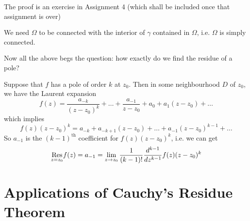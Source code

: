 \documentclass[11pt, oneside]{book}
\begin{document}
The proof is an exercise in Assignment 4 (which shall be included once that assignment is over)

\begin{remark}
  We need $\Omega$ to be connected with the interior of $\gamma$ contained in $\Omega$, i.e. $\Omega$ is simply connected.
\end{remark}

Now all the above begs the question: how exactly do we find the residue of a pole?

Suppose that $f$ has a pole of order $k$ at $z_0$. Then in some neighbourhood $D$ of $z_0$, we have the Laurent expansion
\begin{equation*}
  f(z) = \frac{a_{-k}}{(z - z_0)^k} + \hdots + \frac{a_{-1}}{z - z_0} + a_0 + a_1 (z - z_0) + \hdots  
\end{equation*}
which implies
\begin{equation*}
  f(z) (z - z_0)^k = a_{-k} + a_{-k + 1}(z - z_0) + \hdots + a_{-1}(z - z_0)^{k - 1} + \hdots
\end{equation*}
So $a_{-1}$ is the $(k-1)^{\text{th}}$ coefficient for $f(z) (z - z_0)^k$, i.e. we can get
\begin{equation*}
  \res{f(z)}{z = z_0} = a_{-1} = \lim_{z \to z_0} \frac{1}{(k - 1)!} \frac{d^{k - 1}}{dz^{k -1}} f(z) (z - z_0)^k  
\end{equation*}


\section{Applications of Cauchy's Residue Theorem} %
\label{sec:applications_of_cauchy_s_residue_theorem}
\end{document}
